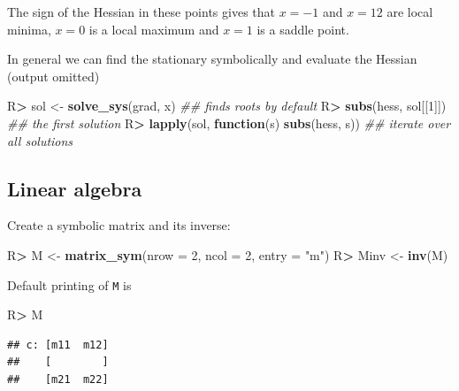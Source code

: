 \documentclass[10pt,]{article}
\newenvironment{Shaded}{\begin{snugshade}}{\end{snugshade}}
\newcommand{\CommentTok}[1]{\textcolor[rgb]{0.56,0.35,0.01}{\textit{#1}}}
\newcommand{\ControlFlowTok}[1]{\textcolor[rgb]{0.13,0.29,0.53}{\textbf{#1}}}
\newcommand{\DataTypeTok}[1]{\textcolor[rgb]{0.13,0.29,0.53}{#1}}
\newcommand{\DecValTok}[1]{\textcolor[rgb]{0.00,0.00,0.81}{#1}}
\newcommand{\KeywordTok}[1]{\textcolor[rgb]{0.13,0.29,0.53}{\textbf{#1}}}
\newcommand{\NormalTok}[1]{#1}
\newcommand{\OperatorTok}[1]{\textcolor[rgb]{0.81,0.36,0.00}{\textbf{#1}}}
\newcommand{\StringTok}[1]{\textcolor[rgb]{0.31,0.60,0.02}{#1}}
\begin{document}
The sign of the Hessian in these points gives that \(x=-1\) and \(x=12\)
are local minima, \(x=0\) is a local maximum and \(x=1\) is a saddle
point.

In general we can find the stationary symbolically and evaluate the
Hessian (output omitted)

\begin{Shaded}
\begin{Highlighting}[]
\NormalTok{R}\OperatorTok{>}\StringTok{ }\NormalTok{sol <-}\StringTok{ }\KeywordTok{solve_sys}\NormalTok{(grad, x) }\CommentTok{## finds roots by default}
\NormalTok{R}\OperatorTok{>}\StringTok{ }\KeywordTok{subs}\NormalTok{(hess, sol[[}\DecValTok{1}\NormalTok{]]) }\CommentTok{## the first solution}
\NormalTok{R}\OperatorTok{>}\StringTok{ }\KeywordTok{lapply}\NormalTok{(sol, }\ControlFlowTok{function}\NormalTok{(s) }\KeywordTok{subs}\NormalTok{(hess, s)) }\CommentTok{## iterate over all solutions}
\end{Highlighting}
\end{Shaded}

\hypertarget{linear-algebra}{%
\subsection{Linear algebra}\label{linear-algebra}}

Create a symbolic matrix and its inverse:

\begin{Shaded}
\begin{Highlighting}[]
\NormalTok{R}\OperatorTok{>}\StringTok{ }\NormalTok{M <-}\StringTok{ }\KeywordTok{matrix_sym}\NormalTok{(}\DataTypeTok{nrow =} \DecValTok{2}\NormalTok{, }\DataTypeTok{ncol =} \DecValTok{2}\NormalTok{, }\DataTypeTok{entry =} \StringTok{"m"}\NormalTok{)}
\NormalTok{R}\OperatorTok{>}\StringTok{ }\NormalTok{Minv <-}\StringTok{ }\KeywordTok{inv}\NormalTok{(M)}
\end{Highlighting}
\end{Shaded}

Default printing of \texttt{M} is

\begin{Shaded}
\begin{Highlighting}[]
\NormalTok{R}\OperatorTok{>}\StringTok{ }\NormalTok{M}
\end{Highlighting}
\end{Shaded}

\begin{verbatim}
## c: [m11  m12]
##    [        ]
##    [m21  m22]
\end{verbatim}
\end{document}
